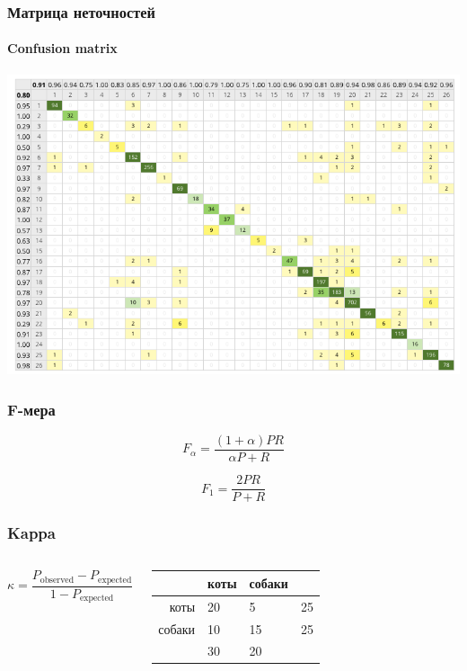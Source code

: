 \documentclass[svgnames]{beamer}
\begin{document}
\begin{frame}
  \frametitle{Матрица неточностей}
  \framesubtitle{Confusion matrix}
  \includegraphics[height=.8\textheight]{confusion-matrix}
\end{frame}


\begin{frame}
  \frametitle{F-мера}
  \begin{equation}
    F_{\alpha} = \frac{(1+\alpha)PR}{\alpha P + R}
  \end{equation}

  \begin{equation}
    F_{1} = \frac{2PR}{P + R}
  \end{equation}  
\end{frame}


\begin{frame}
  \frametitle{Kappa}
  \begin{columns}
    \begin{equation}
      \kappa = \frac{P_{\mathrm{observed}}-P_{\mathrm{expected}}}{1-P_{\mathrm{expected}}}
    \end{equation}
    \begin{tabular}{r|ll|r}
     & коты  & собаки \\
      \hline
    коты & 20 & 5 & \alert{25}\\
    собаки & 10 & 15 & \alert{25} \\
    \hline
    & \alert{30} & \alert{20} & 
    \end{tabular}
  \end{columns}
\end{frame}
\end{document}
